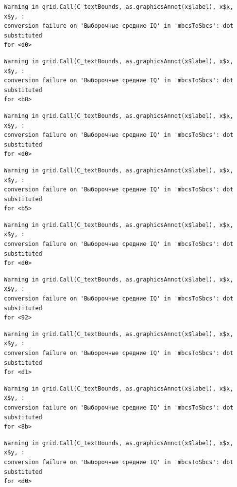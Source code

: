 \documentclass[
  letterpaper,
  DIV=11,
  numbers=noendperiod]{scrreprt}
\theoremstyle{definition}
\theoremstyle{remark}
\begin{document}
\begin{verbatim}
Warning in grid.Call(C_textBounds, as.graphicsAnnot(x$label), x$x, x$y, :
conversion failure on 'Выборочные средние IQ' in 'mbcsToSbcs': dot substituted
for <d0>
\end{verbatim}

\begin{verbatim}
Warning in grid.Call(C_textBounds, as.graphicsAnnot(x$label), x$x, x$y, :
conversion failure on 'Выборочные средние IQ' in 'mbcsToSbcs': dot substituted
for <b8>
\end{verbatim}

\begin{verbatim}
Warning in grid.Call(C_textBounds, as.graphicsAnnot(x$label), x$x, x$y, :
conversion failure on 'Выборочные средние IQ' in 'mbcsToSbcs': dot substituted
for <d0>
\end{verbatim}

\begin{verbatim}
Warning in grid.Call(C_textBounds, as.graphicsAnnot(x$label), x$x, x$y, :
conversion failure on 'Выборочные средние IQ' in 'mbcsToSbcs': dot substituted
for <b5>
\end{verbatim}

\begin{verbatim}
Warning in grid.Call(C_textBounds, as.graphicsAnnot(x$label), x$x, x$y, :
conversion failure on 'Выборочные средние IQ' in 'mbcsToSbcs': dot substituted
for <d0>
\end{verbatim}

\begin{verbatim}
Warning in grid.Call(C_textBounds, as.graphicsAnnot(x$label), x$x, x$y, :
conversion failure on 'Выборочные средние IQ' in 'mbcsToSbcs': dot substituted
for <92>
\end{verbatim}

\begin{verbatim}
Warning in grid.Call(C_textBounds, as.graphicsAnnot(x$label), x$x, x$y, :
conversion failure on 'Выборочные средние IQ' in 'mbcsToSbcs': dot substituted
for <d1>
\end{verbatim}

\begin{verbatim}
Warning in grid.Call(C_textBounds, as.graphicsAnnot(x$label), x$x, x$y, :
conversion failure on 'Выборочные средние IQ' in 'mbcsToSbcs': dot substituted
for <8b>
\end{verbatim}

\begin{verbatim}
Warning in grid.Call(C_textBounds, as.graphicsAnnot(x$label), x$x, x$y, :
conversion failure on 'Выборочные средние IQ' in 'mbcsToSbcs': dot substituted
for <d0>
\end{verbatim}
\end{document}
